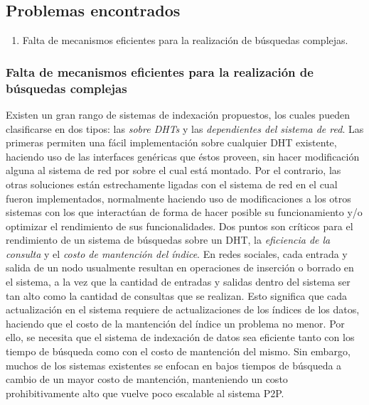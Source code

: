 \subsection{Problemas encontrados}

\begin{enumerate}
    \item Falta de mecanismos eficientes para la realización de búsquedas complejas.
\end{enumerate}

  \subsubsection{Falta de mecanismos eficientes para la realización de búsquedas complejas}

     Existen un gran rango de sistemas de indexación propuestos, los cuales pueden clasificarse en
    dos tipos: las \textit{sobre DHTs} y las \textit{dependientes del sistema de red}.
    Las primeras permiten una fácil implementación sobre cualquier DHT existente,
    haciendo uso de las interfaces genéricas que éstos proveen, sin hacer modificación
    alguna al sistema de red por sobre el cual está montado. Por el contrario, las
    otras soluciones están estrechamente ligadas con el sistema de red en el cual
    fueron implementados, normalmente haciendo uso de modificaciones a los otros
    sistemas con los que interactúan de forma de hacer posible su funcionamiento
    y/o optimizar el rendimiento de sus funcionalidades.
    Dos puntos son críticos para el rendimiento de un sistema de
    búsquedas sobre un DHT, la \textit{eficiencia de la consulta} y el
    \textit{costo de mantención del índice}. En redes sociales, cada entrada y
    salida de un nodo usualmente resultan en operaciones de inserción o borrado
    en el sistema, a la vez que la cantidad de entradas y salidas dentro del
    sistema ser tan alto como la cantidad de consultas que se realizan. Esto
    significa que cada actualización en el sistema requiere de actualizaciones de
    los índices de los datos, haciendo que el costo de la mantención del índice un
    problema no menor. Por ello, se necesita que el sistema de indexación de datos
    sea eficiente tanto con los tiempo de búsqueda como con el costo de mantención
    del mismo. Sin embargo, muchos de los sistemas existentes se enfocan en bajos
    tiempos de búsqueda a cambio de un mayor costo de mantención, manteniendo un costo prohibitivamente alto
    que vuelve poco escalable al sistema P2P.  %

